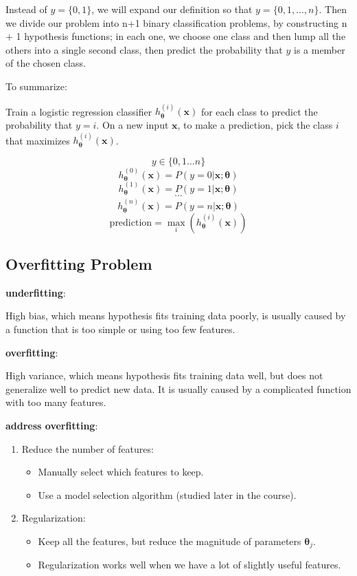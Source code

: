\documentclass{article}
\begin{document}
\noindent Instead of \(y = \{0, 1\}\), we will expand our definition so that \(y = \{0, 1, ..., n\}\). Then we divide our problem into n+1 binary classification problems, by constructing n + 1 hypothesis functions; in each one, we choose one class and then lump all the others into a single second class, then predict the probability that \(y\) is a member of the chosen class.

\bigskip

\noindent To summarize: 

\noindent Train a logistic regression classifier \(h_{\boldsymbol{\theta}}^{(i)}(\textbf{x})\) for each class to predict the probability that \(y = i\). On a new input \(\textbf{x}\), to make a prediction, pick the class \(i\) that maximizes \(h_{\boldsymbol{\theta}} ^{(i)}(\textbf{x})\).

\[y \in \{0, 1 ... n\}\] 
\[h_{\boldsymbol{\theta}}^{(0)}(\textbf{x}) = P(y = 0 | \textbf{x} ; \boldsymbol{\theta})\]
\[h_{\boldsymbol{\theta}}^{(1)}(\textbf{x}) = P(y = 1 | \textbf{x} ; \boldsymbol{\theta})\]
\[\cdots\]
\[h_{\boldsymbol{\theta}}^{(n)}(\textbf{x}) = P(y = n | \textbf{x} ; \boldsymbol{\theta})\] 
\[\text{prediction} = \max_i(h_{\boldsymbol{\theta}}^{(i)}(\textbf{x}))\]

\subsection{Overfitting Problem}

\noindent \textbf{underfitting}:

\noindent High bias, which means hypothesis fits training data poorly, is usually caused by a function that is too simple or using too few features. 

\bigskip

\noindent \textbf{overfitting}:

\noindent High variance, which means hypothesis fits training data well, but does not generalize well to predict new data. It is usually caused by a complicated function with too many features.

\bigskip

\noindent \textbf{address overfitting}:

\begin{enumerate}
\item Reduce the number of features:
\begin{itemize}
\item Manually select which features to keep.
\item Use a model selection algorithm (studied later in the course).
\end{itemize}
\item Regularization:
\begin{itemize}
\item Keep all the features, but reduce the magnitude of parameters \(\boldsymbol{\theta}_j\).
\item Regularization works well when we have a lot of slightly useful features.
\end{itemize}
\end{enumerate}
\end{document}
